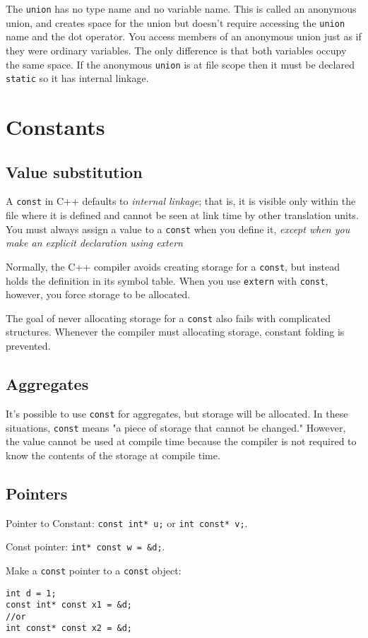 \documentclass[11pt, a4paper]{book}
\begin{document}
The \verb|union| has no type name and no variable name. This is called an
anonymous union, and creates space for the union but doesn't require accessing
the \verb|union| name and the dot operator. You access members of an anonymous
union just as if they were ordinary variables. The only difference is that both
variables occupy the same space. If the anonymous \verb|union| is at file scope
then it must be declared \verb|static| so it has internal linkage.

\chapter{Constants}
\section{Value substitution}
A \verb|const| in C++ defaults to \emph{internal linkage}; that is, it is
visible only within the file where it is defined and cannot be seen at link time
by other translation units. You must always assign a value to a \verb|const|
when you define it, \emph{except when you make an explicit declaration using
extern}

Normally, the C++ compiler avoids creating storage for a \verb|const|, but
instead holds the definition in its symbol table. When you use \verb|extern|
with \verb|const|, however, you force storage to be allocated.

The goal of never allocating storage for a \verb|const| also fails with
complicated structures. Whenever the compiler must allocating storage, constant
folding is prevented.

\section{Aggregates}
It's possible to use \verb|const| for aggregates, but storage will be allocated.
In these situations, \verb|const| means "a piece of storage that cannot be
changed." However, the value cannot be used at compile time because the compiler
is not required to know the contents of the storage at compile time.

\section{Pointers}
Pointer to Constant: \verb|const int* u;| or \verb|int const* v;|.

Const pointer: \verb|int* const w = &d;|.

Make a \verb|const| pointer to a \verb|const| object:
\begin{verbatim}
int d = 1;
const int* const x1 = &d;
//or
int const* const x2 = &d;
\end{verbatim}
\end{document}
